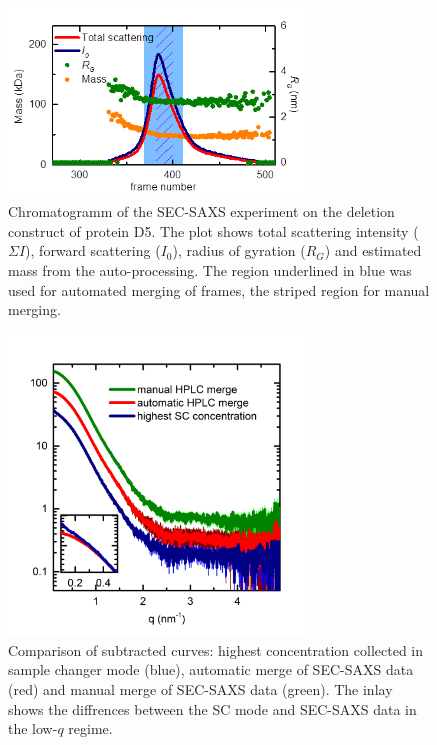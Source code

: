 \documentclass[preprint,pdf]{iucr}              %
\begin{document}
\begin{figure}
\centering
\includegraphics[width=8cm]{sec.png}
\caption{Chromatogramm of the SEC-SAXS experiment on the deletion construct of
protein D5.
The plot shows total scattering intensity ($\Sigma I$), forward scattering
($I_0$), radius of gyration ($R_G$) and estimated mass from the
auto-processing.
The region underlined in blue was used for automated merging of frames, the
striped region for manual merging.}
\label{fgr:SEC}
\end{figure}

\begin{figure}
\centering
\includegraphics[width=8cm]{curves.png}
\caption{Comparison of subtracted curves: highest concentration collected in
sample changer mode (blue), automatic merge of SEC-SAXS data (red) and manual
merge of SEC-SAXS data (green). The inlay shows the diffrences between the SC mode and SEC-SAXS data in the low-$q$ regime. }
\label{fgr:curves}
\end{figure}
\end{document}
